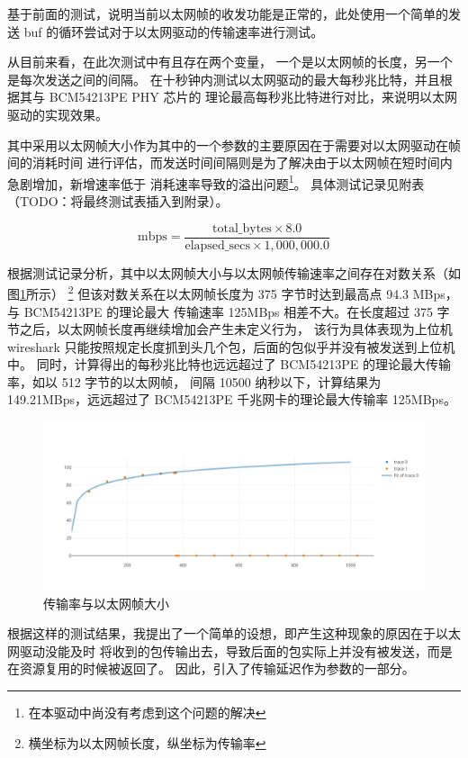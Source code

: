     基于前面的测试，说明当前以太网帧的收发功能是正常的，此处使用一个简单的发送 buf
    的循环尝试对于以太网驱动的传输速率进行测试。

    从目前来看，在此次测试中有且存在两个变量， 一个是以太网帧的长度，另一个是每次发送之间的间隔。
    在十秒钟内测试以太网驱动的最大每秒兆比特，并且根据其与 BCM54213PE PHY 芯片的
    理论最高每秒兆比特进行对比，来说明以太网驱动的实现效果。

    其中采用以太网帧大小作为其中的一个参数的主要原因在于需要对以太网驱动在帧间的消耗时间
    进行评估，而发送时间间隔则是为了解决由于以太网帧在短时间内急剧增加，新增速率低于
    消耗速率导致的溢出问题\footnote{在本驱动中尚没有考虑到这个问题的解决}。
    具体测试记录见附表（TODO：将最终测试表插入到附录）。

    $$\text{mbps} = \frac{\text{total\_bytes} \times 8.0}{\text{elapsed\_secs} \times 1,000,000.0}$$

    根据测试记录分析，其中以太网帧大小与以太网帧传输速率之间存在对数关系（如图\ref{test::传输率与以太网帧大小}所示）
    \footnote{横坐标为以太网帧长度，纵坐标为传输率}
    但该对数关系在以太网帧长度为 375 字节时达到最高点 94.3 MBps，与 BCM54213PE 的理论最大
    传输速率 125MBps 相差不大。在长度超过 375 字节之后，以太网帧长度再继续增加会产生未定义行为，
    该行为具体表现为上位机 wireshark 只能按照规定长度抓到头几个包，后面的包似乎并没有被发送到上位机中。
    同时，计算得出的每秒兆比特也远远超过了 BCM54213PE 的理论最大传输率，如以 512 字节的以太网帧， 间隔 10500 纳秒以下，计算结果为 149.21MBps，远远超过了 BCM54213PE 千兆网卡的理论最大传输率 125MBps。

    \begin{figure}[ht]
        \centering
        \includegraphics[width=\textwidth]{./imgs/测试-传输率与以太网帧大小.png}
        \caption{传输率与以太网帧大小}    \label{test::传输率与以太网帧大小}
    \end{figure}   

    根据这样的测试结果，我提出了一个简单的设想，即产生这种现象的原因在于以太网驱动没能及时
    将收到的包传输出去，导致后面的包实际上并没有被发送，而是在资源复用的时候被返回了。
    因此，引入了传输延迟作为参数的一部分。

